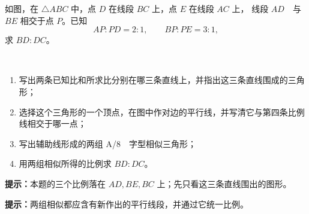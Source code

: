 \documentclass{exam-zh}
\begin{document}
\begin{problem}[points=10]
  \noindent
  \begin{minipage}[t]{\dimexpr\linewidth-60mm-6mm\relax}
    \vspace{0pt}
    如图，在 $\triangle ABC$ 中，点 $D$ 在线段 $BC$ 上，点 $E$ 在线段 $AC$ 上，
线段 $AD$\ \ 与 $BE$ 相交于点 $P$。已知
\[
AP:PD=2:1,\qquad BP:PE=3:1,
\]
求 $BD:DC$。

\ \begin{enumerate}[label=(\arabic*)]
  \item 写出两条已知比和所求比分别在哪三条直线上，并指出这三条直线围成的三角形；
\ \  \item 选择这个三角形的一个顶点，在图中作对边的平行线，并写清它与第四条比例线相交于哪一点；
  \item 写出辅助线形成的两组 A/8\ \ 字型相似三角形；
  \item 用两组相似所得的比例求 $BD:DC$。
\end{enumerate}

    \begin{hintbox}
\textbf{提示：}本题的三个比例落在 $AD,BE,BC$ 上；先只看这三条直线围出的图形。\end{hintbox}
\begin{hintbox}
\textbf{提示：}两组相似都应含有新作出的平行线段，并通过它统一比例。\end{hintbox}

  \end{minipage}\hfill
  \begin{diagramcoltikz}{60mm}{第 3 题原始构型，请在图上补作辅助线。}
  }
  \end{diagramcoltikz}
  \par\medskip
  \answerarea[68mm]
\end{problem}
\end{document}
